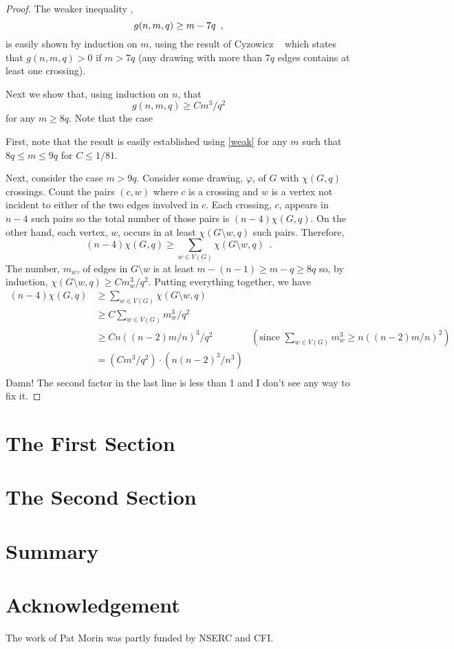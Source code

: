\documentclass{patmorin}
\begin{document}
\begin{proof}
The weaker inequality ,
\begin{equation}
  g(n,m,q)\ge m-7q \enspace ,\eqlabel{weak}
\end{equation}  
is easily shown by induction
on $m$, using the result of Cyzowicz \etal\ \cite{X} which states that
$g(n,m,q) > 0$ if $m> 7q$ (any drawing with more than $7q$ edges contains
at least one crossing).

Next we show that, using induction on $n$, that 
\[
   g(n,m,q) \ge Cm^3/q^2
\]
for any $m\ge 8q$.  Note that the case 


First, note that the result is easily established
using \eqref{weak} for any $m$ such that $8q\le m\le 9q$ for $C\le 1/81$.

Next, consider the case $m> 9q$.  Consider some drawing, $\varphi$, of
$G$ with $\chi(G,q)$ crossings.  Count the pairs $(c,w)$ where $c$ is
a crossing and $w$ is a vertex not incident to either of the two edges
involved in $c$.  Each crossing, $c$, appears in $n-4$ such pairs so
the total number of those pairs is $(n-4)\chi(G,q)$.  On the other hand,
each vertex, $w$, occurs in at least $\chi(G\setminus w,q)$ such pairs.
Therefore,
\[
   (n-4)\chi(G,q) \ge \sum_{w\in V(G)} \chi(G\setminus w, q) \enspace .
\]
The number, $m_w$, of edges in $G\setminus w$ is at least $m-(n-1)
\ge m-q\ge 8q$ so, by induction, $\chi(G\setminus w,q)\ge Cm_w^3/q^2$.
Putting everything together, we have
\begin{align*}
  (n-4)\chi(G,q) 
    & \ge  \sum_{w\in V(G)} \chi(G\setminus w, q) \\
    & \ge  C\sum_{w\in V(G)} m_w^3/q^2  \\
    & \ge  Cn((n-2)m/n)^3/q^2 & \left(\mbox{since $\sum_{w\in V(G)} m_w^3\ge n((n-2)m/n)^2$}\right) \\
    & =  (Cm^3/q^2)\cdot(n(n-2)^3/n^3)  \\
\end{align*}
Damn! The second factor in the last line is less than 1 and I don't see any
way to fix it.
\end{proof}


\section{The First Section}

\section{The Second Section}

\section{Summary}

\section*{Acknowledgement}

The work of Pat Morin was partly funded by NSERC and CFI.



\end{document}

